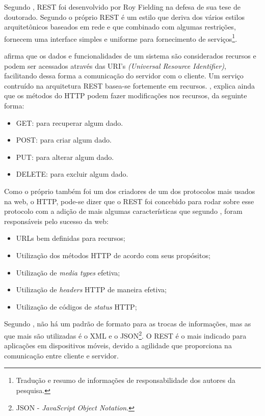 	
	\par Segundo , REST foi desenvolvido por Roy Fielding
na defesa de sua tese de doutorado. Segundo o próprio 
REST é um estilo que deriva dos vários estilos arquitetônicos baseados em rede
e  que combinado com algumas restrições, fornecem uma interface simples e
uniforme para fornecimento de serviços\footnote{Tradução e resumo de
informações de responsabilidade dos autores da pesquisa.}.
			
	\par {} afirma que os dados e funcionalidades de um sistema
são considerados recursos e podem ser acessados através das URI's
\textit{(Universal Resource Identifier)}, facilitando dessa forma a comunicação
do servidor com o cliente. Um serviço contruído na arquitetura REST basea-se
fortemente em recursos. , explica ainda que os métodos
do HTTP podem fazer modificações nos recursos, da seguinte forma:
	
	\begin{itemize}
		\item GET: para recuperar algum dado. 
		\item POST: para criar algum dado.
		\item PUT: para alterar algum dado. 
		\item DELETE: para excluir algum dado. 
	\end{itemize}

	\par Como o próprio  também foi um dos criadores de
um dos protocolos mais usados na web, o HTTP, pode-se dizer que o REST foi
concebido para rodar sobre esse protocolo com a adição de mais algumas
características que segundo , foram responsáveis pelo
sucesso da web:
		
	\begin{itemize}
		\item URLs bem definidas para recursos;
		\item Utilização dos métodos HTTP de acordo com seus propósitos;
		\item Utilização de \textit{media types} efetiva;
		\item Utilização de \textit{headers} HTTP de maneira efetiva;
		\item Utilização de códigos de \textit{status} HTTP;
	\end{itemize}
			 
	\par Segundo , não há um padrão de formato para as
 trocas de informações, mas as que mais são utilizadas é o XML e o JSON\footnote{JSON - 
 \textit{JavaScript Object Notation}.}. O REST é o mais indicado para aplicações
 em dispositivos móveis, devido a agilidade que proporciona na comunicação
 entre cliente e servidor.

